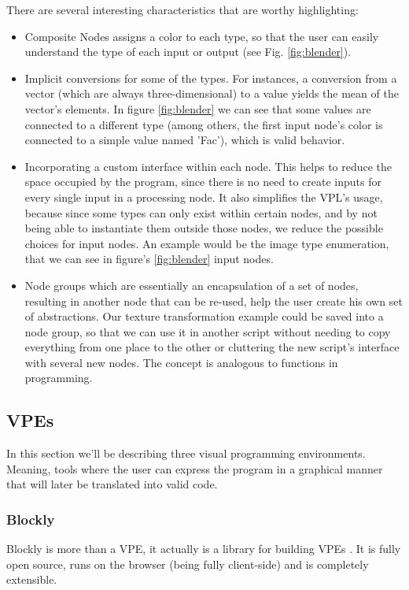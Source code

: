 There are several interesting characteristics that are worthy highlighting:
\begin{itemize}
  \item Composite Nodes assigns a color to each type, so that the user can
easily understand the type of each input or output (see Fig. \ref{fig:blender}).
  \item Implicit conversions for some of the types. For instances,
a conversion from a vector (which are always three-dimensional) to a value yields
the mean of the vector's elements. In figure \ref{fig:blender} we can see that
some values are connected to a different type (among others, the first input
node's color is connected to a simple value named 'Fac'), which is valid behavior.
  \item Incorporating a custom interface within each node. This helps to reduce
the space occupied by the program, since there is no need to create inputs for
every single input in a processing node. It also simplifies the VPL's usage,
because since some types can only exist within certain nodes, and by not being
able to instantiate them outside those nodes, we reduce the possible choices
for input nodes. An example would be the image type enumeration, that we can
see in figure's \ref{fig:blender} input nodes.
  \item Node groups which are essentially an encapsulation
of a set of nodes, resulting in another node that can be re-used, help the user
create his own set of abstractions. Our texture transformation example could
be saved into a node group, so that we can use it in another script without
needing to copy everything from one place to the other or cluttering the new
script's interface with several new nodes. The concept is analogous to functions
in programming.
\end{itemize}

\subsection{VPEs}

In this section we'll be describing three visual programming environments. Meaning,
tools where the user can express the program in a graphical manner that will
later be translated into valid code.

\subsubsection{Blockly}

Blockly is more than a VPE, it actually is a library for building VPEs \cite{blockly}.
It is fully open source, runs on the browser (being fully client-side) and is completely extensible.

